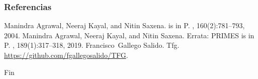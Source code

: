 \documentclass{beamer}
\begin{document}
\begin{frame}
\frametitle{Referencias}
\footnotesize{
	\begin{thebibliography}{99} %
		Manindra Agrawal, Neeraj Kayal, and Nitin Saxena.
			 is in {P}.
			, 160(2):781--793, 2004.
		Manindra Agrawal, Neeraj Kayal, and Nitin Saxena.
			\newblock Errata: {PRIMES} is in {P}.
			, 189(1):317--318, 2019.
		Francisco~Gallego Salido.
			\newblock Tfg.
			\newblock \url{https://github.com/fgallegosalido/TFG}.
	\end{thebibliography}
}
\end{frame}


\begin{frame}
\Huge{\centerline{Fin}}
\end{frame}

\end{document}
